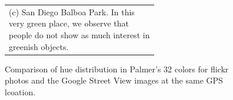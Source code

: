 \begin{figure}
\begin{tabular}{m{0.6\linewidth}}
(c) San Diego Balboa Park. In this very green place, we observe that people do not show as much interest in greenish objects.\\
\end{tabular}
\caption{Comparison of hue distribution in Palmer's 32 colors for flickr photos and the Google Street View images at the same GPS lcoation.}
\label{fig:street}
\end{figure}


